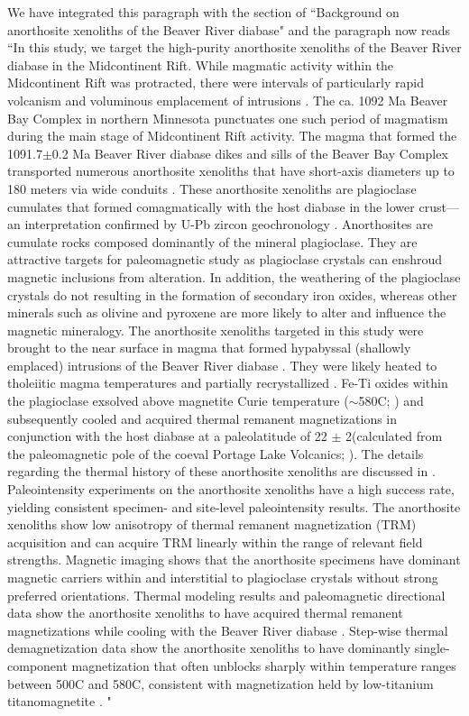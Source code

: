 \documentclass[11pt, letterpaper]{article}
\begin{document}
\begin{flushleft}
We have integrated this paragraph with the section of ``Background on anorthosite xenoliths of the Beaver River diabase" and the paragraph now reads ``In this study, we target the high-purity anorthosite xenoliths of the Beaver River diabase in the Midcontinent Rift. While magmatic activity within the Midcontinent Rift was protracted, there were intervals of particularly rapid volcanism and voluminous emplacement of intrusions \cite{Swanson-Hysell2021a}. The ca. 1092 Ma Beaver Bay Complex in northern Minnesota punctuates one such period of magmatism during the main stage of Midcontinent Rift activity. The magma that formed the 1091.7$\pm$0.2 Ma Beaver River diabase dikes and sills of the Beaver Bay Complex transported numerous anorthosite xenoliths that have short-axis diameters up to 180 meters via wide conduits \cite{Boerboom2004a, Boerboom2006b}. These anorthosite xenoliths are plagioclase cumulates that formed comagmatically with the host diabase in the lower crust---an interpretation confirmed by U-Pb zircon geochronology \cite{Zhang2021b}. Anorthosites are cumulate rocks composed dominantly of the mineral plagioclase. They are attractive targets for paleomagnetic study as plagioclase crystals can enshroud magnetic inclusions from alteration. In addition, the weathering of the plagioclase crystals do not resulting in the formation of secondary iron oxides, whereas other minerals such as olivine and pyroxene are more likely to alter and influence the magnetic mineralogy. The anorthosite xenoliths targeted in this study were brought to the near surface in magma that formed hypabyssal (shallowly emplaced) intrusions of the Beaver River diabase \cite{Zhang2021b}. They were likely heated to tholeiitic magma temperatures and partially recrystallized \cite{Zhang2021b}. Fe-Ti oxides within the plagioclase exsolved above magnetite Curie temperature ($\sim$580\textdegree C; \cite{Bian2021a}) and subsequently cooled and acquired thermal remanent magnetizations in conjunction with the host diabase at a paleolatitude of 22 $\pm$ 2\textdegree (calculated from the paleomagnetic pole of the coeval Portage Lake Volcanics; \citealp{Swanson-Hysell2019a}). The details regarding the thermal history of these anorthosite xenoliths are discussed in \cite{Zhang2021b}. Paleointensity experiments on the anorthosite xenoliths have a high success rate, yielding consistent specimen- and site-level paleointensity results. The anorthosite xenoliths show low anisotropy of thermal remanent magnetization (TRM) acquisition and can acquire TRM linearly within the range of relevant field strengths. Magnetic imaging shows that the anorthosite specimens have dominant magnetic carriers within and interstitial to plagioclase crystals without strong preferred orientations. Thermal modeling results and paleomagnetic directional data show the anorthosite xenoliths to have acquired thermal remanent magnetizations while cooling with the Beaver River diabase \cite{Zhang2021b}. Step-wise thermal demagnetization data show the anorthosite xenoliths to have dominantly single-component magnetization that often unblocks sharply within temperature ranges between 500\textdegree C and 580\textdegree C, consistent with magnetization held by low-titanium titanomagnetite \cite{Zhang2021b}. "


\end{flushleft}
\end{document}
